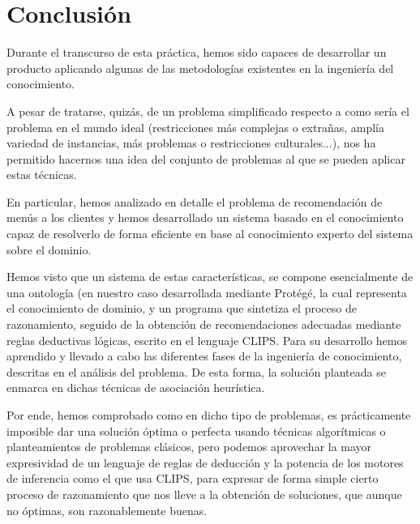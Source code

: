 \documentclass{article}
\begin{document}
\newpage
\section{Conclusión}
Durante el transcurso de esta práctica, hemos sido capaces de desarrollar un producto aplicando algunas de las metodologías existentes en la ingeniería del conocimiento.
\par
A pesar de tratarse, quizás, de un problema simplificado respecto a como sería el problema en el mundo ideal (restricciones más complejas o extrañas, amplía variedad de instancias, más problemas o restricciones culturales...), nos ha permitido hacernos una idea del conjunto de problemas al que se pueden aplicar estas técnicas.
\par
En particular, hemos analizado en detalle el problema de recomendación de menús a los clientes y hemos desarrollado un sistema basado en el conocimiento capaz de resolverlo de forma eficiente en base al conocimiento experto del sistema sobre el dominio.
\par
Hemos visto que un sistema de estas características, se compone esencialmente de una ontología (en nuestro caso desarrollada mediante Protégé, la cual representa el conocimiento de dominio, y un programa que sintetiza el proceso de razonamiento, seguido de la obtención de recomendaciones adecuadas mediante reglas deductivas lógicas, escrito en el lenguaje CLIPS. Para su desarrollo hemos aprendido y llevado a cabo las diferentes fases de la ingeniería de conocimiento, descritas en el análisis del problema. De esta forma, la solución planteada se enmarca en dichas técnicas de asociación heurística.
\par
Por ende, hemos comprobado como en dicho tipo de problemas, es prácticamente imposible dar una solución óptima o perfecta usando técnicas algorítmicas o planteamientos de problemas clásicos, pero podemos aprovechar la mayor expresividad de un lenguaje de reglas de deducción y la potencia de los motores de inferencia como el que usa CLIPS, para expresar de forma simple cierto proceso de razonamiento que nos lleve a la obtención de soluciones, que aunque no óptimas, son razonablemente buenas.
\end{document}

